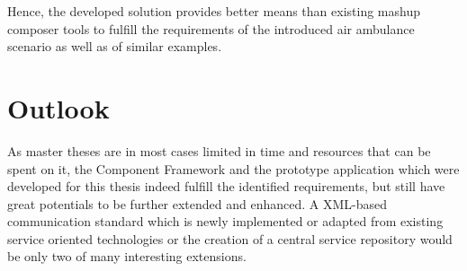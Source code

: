 Hence, the developed solution provides better means than existing mashup composer tools to fulfill
the requirements of the introduced air ambulance scenario as well as of similar examples.

\section{Outlook}

As master theses are in most cases limited in time and resources that can be spent on it, the
Component Framework and the prototype application which were developed for this thesis indeed
fulfill the identified requirements, but still have great potentials to be further extended and
enhanced. A XML-based communication standard which is newly implemented or adapted from existing
service oriented technologies or the creation of a central service repository would be only two of
many interesting extensions.